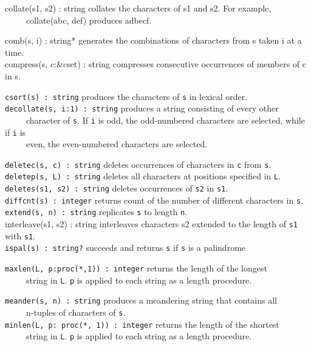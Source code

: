 \textsf{collate(s1, s2) : string} collates the characters
of s1 and s2. For example,\\
 \ \ \ \ \ \textsf{collate({\textquotedbl}abc{\textquotedbl},
{\textquotedbl}def{\textquotedbl})} produces
\textsf{{\textquotedbl}adbecf{\textquotedbl}}.

\textsf{comb(s, i) : string*} generates the combinations of characters from s taken i at a time.\\
\textsf{compress(s, c:\&cset) : string} compresses consecutive
occurrences of members of c in s.

\texttt{csort(s) : string} produces the characters of \texttt{s} in
lexical order.\\
\texttt{decollate(s, i:1) : string} produces a string consisting of
every other\\
 \ \ \ \ \ character of \texttt{s}. If \texttt{i} is odd, the
odd-numbered characters are selected, while if \texttt{i} is\\
 \ \ \ \ \ even, the even-numbered characters are selected.

\texttt{deletec(s, c) : string} deletes occurrences of characters in
\texttt{c} from \texttt{s}.\\
\texttt{deletep(s, L) : string} deletes all characters at positions
specified in \texttt{L}.\\
\texttt{deletes(s1, s2) : string} deletes occurrences of \texttt{s2} in
\texttt{s1}.\\
\texttt{diffcnt(s) : integer} returns count of the number of different
characters in \texttt{s}.\\
\texttt{extend(s, n) : string} replicates \texttt{s} to length
\texttt{n}.\\
\textsf{interleave(s1, s2) : string} interleaves characters \textsf{s2}
extended to the length of \texttt{s1} with \texttt{s1}.\\
\texttt{ispal(s) : string?} succeeds and returns \texttt{s} if
\texttt{s} is a palindrome

\texttt{maxlen(L, p:proc({\textquotedbl}*{\textquotedbl},1)) : integer}
returns the length of the longest\\
 \ \ \ \ \ string in \texttt{L}. \texttt{p} is applied to each string as
a {\textquotedbl}length{\textquotedbl} procedure.

\texttt{meander(s, n) : string} produces a
{\textquotedbl}meandering{\textquotedbl} string that contains
all\\
 \ \ \ \ \ n-tuples of characters of \texttt{s}.\\
\texttt{minlen(L, p: proc({\textquotedbl}*{\textquotedbl}, 1)) :
integer} returns the length of the shortest\\
 \ \ \ \ \ string in \texttt{L}. \texttt{p} is applied to each string as
a {\textquotedbl}length{\textquotedbl} procedure.

